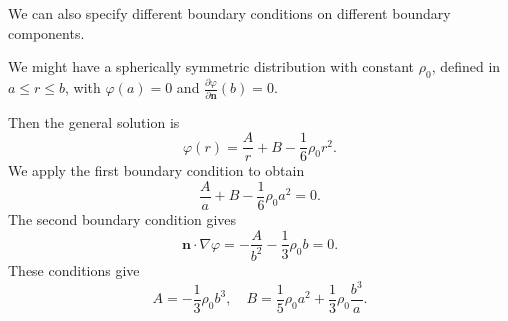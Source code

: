 \documentclass[a4paper]{article}
\begin{document}
We can also specify different boundary conditions on different boundary components.

\begin{eg}
  We might have a spherically symmetric distribution with constant $\rho_0$, defined in $a \leq r \leq b$, with $\varphi(a) = 0$ and $\frac{\partial \varphi}{\partial \mathbf{n}}(b) = 0$.

  Then the general solution is
  \[
    \varphi(r) = \frac{A}{r} + B - \frac{1}{6}\rho_0 r^2.
  \]
  We apply the first boundary condition to obtain
  \[
    \frac{A}{a} + B - \frac{1}{6}\rho_0 a^2 = 0.
  \]
  The second boundary condition gives
  \[
    \mathbf{n}\cdot \nabla \varphi = -\frac{A}{b^2} - \frac{1}{3}\rho_0 b = 0.
  \]
  These conditions give
  \[
    A = -\frac{1}{3}\rho_0 b^3, \quad B = \frac{1}{5}\rho_0 a^2 + \frac{1}{3}\rho_0 \frac{b^3}{a}.
  \]
\end{eg}
\end{document}
